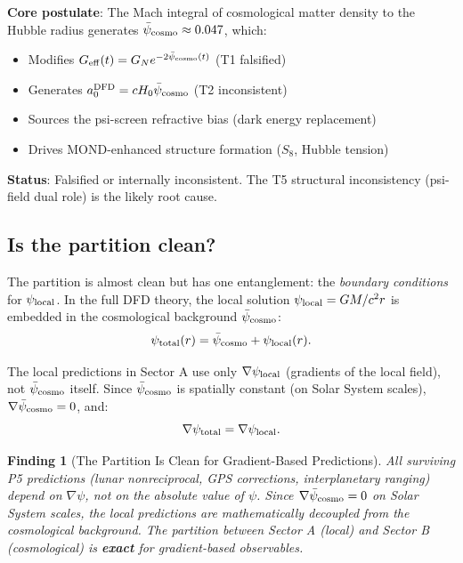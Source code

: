 \documentclass[11pt]{article}
\newtheorem{finding}{Finding}
\newcommand{\psicosmo}{\bar{\psi}_{\rm cosmo}}
\newcommand{\Hzero}{H_0}
\begin{document}
\begin{tcolorbox}[colback=red!5!white, colframe=red!60!black,
  title=\textbf{Sector B: Cosmological DFD --- Requires Fundamental Repair}]
\textbf{Core postulate}: The Mach integral of cosmological matter density
to the Hubble radius generates $\psicosmo \approx 0.047$, which:
\begin{itemize}[nosep]
\item Modifies $G_{\rm eff}(t) = G_N e^{-2\psicosmo(t)}$ (T1 falsified)
\item Generates $a_0^{\rm DFD} = c\Hzero\psicosmo$ (T2 inconsistent)
\item Sources the psi-screen refractive bias (dark energy replacement)
\item Drives MOND-enhanced structure formation ($S_8$, Hubble tension)
\end{itemize}

\textbf{Status}: Falsified or internally inconsistent. The T5 structural
inconsistency (psi-field dual role) is the likely root cause.
\end{tcolorbox}

\subsection{Is the partition clean?}

The partition is almost clean but has one entanglement: the \emph{boundary
conditions} for $\psi_{\rm local}$. In the full DFD theory, the local
solution $\psi_{\rm local} = GM/c^2 r$ is embedded in the cosmological
background $\psicosmo$:
\begin{equation}
\psi_{\rm total}(r) = \psicosmo + \psi_{\rm local}(r).
\label{eq:psi-total}
\end{equation}

The local predictions in Sector A use only $\nabla\psi_{\rm local}$
(gradients of the local field), not $\psicosmo$ itself. Since $\psicosmo$
is spatially constant (on Solar System scales), $\nabla\psicosmo = 0$, and:
\begin{equation}
\nabla\psi_{\rm total} = \nabla\psi_{\rm local}.
\label{eq:grad-clean}
\end{equation}

\begin{finding}[The Partition Is Clean for Gradient-Based Predictions]
\label{find:partition-clean}
All surviving P5 predictions (lunar nonreciprocal, GPS corrections,
interplanetary ranging) depend on $\nabla\psi$, not on the absolute value
of $\psi$. Since $\nabla\psicosmo = 0$ on Solar System scales, the local
predictions are mathematically decoupled from the cosmological background.
The partition between Sector A (local) and Sector B (cosmological) is
\textbf{exact} for gradient-based observables.
\end{finding}
\end{document}
